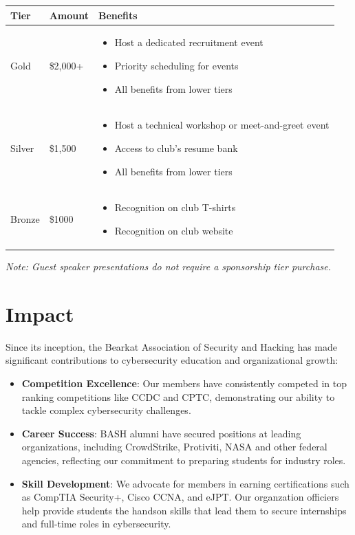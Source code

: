 \documentclass[11pt,letterpaper]{article}
\begin{document}
\begin{table}[h]
    \centering
    \begin{tabular}{p{2cm}p{3cm}p{8cm}}
        \toprule
        \textbf{Tier} & \textbf{Amount} & \textbf{Benefits} \\
        \midrule
        Gold & \$2,000+ & 
        \begin{itemize}[leftmargin=*,nosep]
            \item Host a dedicated recruitment event
            \item Priority scheduling for events
            \item All benefits from lower tiers
        \end{itemize} \\
        Silver & \$1,500 & 
        \begin{itemize}[leftmargin=*,nosep]
            \item Host a technical workshop or meet-and-greet event
            \item Access to club's resume bank
            \item All benefits from lower tiers
        \end{itemize} \\
        Bronze & \$1000 & 
        \begin{itemize}[leftmargin=*,nosep]
            \item Recognition on club T-shirts
            \item Recognition on club website
        \end{itemize} \\
        \bottomrule
    \end{tabular}
\end{table}
\vspace{2cm}
\textit{Note: Guest speaker presentations do not require a sponsorship tier purchase.}

\section*{Impact}
Since its inception, the Bearkat Association of Security and Hacking has made significant contributions to cybersecurity education and organizational growth:

\begin{itemize}
    \item \textbf{Competition Excellence}: Our members have consistently competed in top ranking competitions like C\-C\-D\-C and C\-P\-T\-C\@, demonstrating our ability to tackle complex cybersecurity challenges.
    \item \textbf{Career Success}: BASH alumni have secured positions at leading organizations, including CrowdStrike, Protiviti, NASA and other federal agencies, reflecting our commitment to preparing students for industry roles.
    \item \textbf{Skill Development}: We advocate for members in earning certifications such as CompTIA Security+, Cisco C\-C\-N\-A, and eJPT\@. Our organzation officiers help provide students the handson skills that lead them to secure internships and full-time roles in cybersecurity.
\end{itemize}
\end{document}
